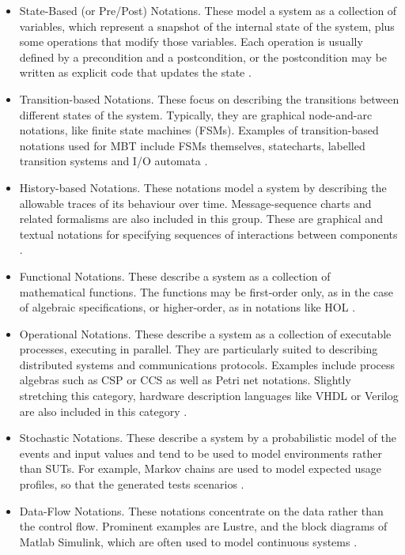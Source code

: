 \begin{itemize}
\item State-Based (or Pre/Post) Notations. These model a system as a collection of variables, which represent a snapshot of the internal state of the system, plus some operations that modify those variables. Each operation is usually defined by a precondition and a postcondition, or the postcondition may be written as explicit code that updates the state \cite{MarkUtting2012}.
\item Transition-based Notations. These focus on describing the transitions between different states
of the system. Typically, they are graphical node-and-arc notations, like finite state machines
(FSMs). Examples of transition-based notations used for MBT include FSMs themselves, statecharts, labelled transition systems and I/O automata \cite{MarkUtting2012}.
\item History-based Notations. These notations model a system by describing the allowable traces
of its behaviour over time. Message-sequence charts and related formalisms are also included in this group. These are
graphical and textual notations for specifying sequences of interactions between components \cite{MarkUtting2012}.
\item Functional Notations. These describe a system as a collection of mathematical functions. The
functions may be first-order only, as in the case of algebraic specifications, or higher-order, as in
notations like HOL \cite{MarkUtting2012}.
\item Operational Notations. These describe a system as a collection of executable processes,
executing in parallel. They are particularly suited to describing distributed systems and
communications protocols. Examples include process algebras such as CSP or CCS as well as
Petri net notations. Slightly stretching this category, hardware description languages like VHDL
or Verilog are also included in this category \cite{MarkUtting2012}.
\item Stochastic Notations. These describe a system by a probabilistic model of the events and input
values and tend to be used to model environments rather than SUTs. For example, Markov chains
are used to model expected usage profiles, so that the generated tests scenarios \cite{MarkUtting2012}.
\item Data-Flow Notations. These notations concentrate on the data rather than the control flow.
Prominent examples are Lustre, and the block diagrams of Matlab Simulink, which are often used
to model continuous systems \cite{MarkUtting2012}.
\end{itemize}

